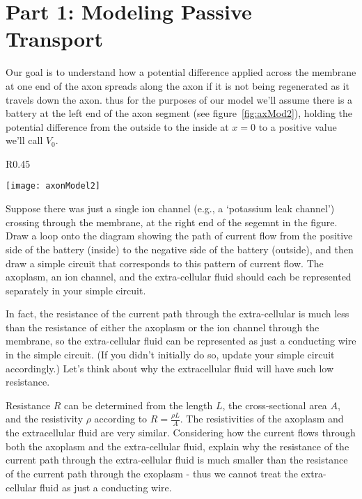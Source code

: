 \section*{Part 1: Modeling Passive Transport}
Our goal is to understand how a potential difference applied across the membrane at one end of the axon spreads along the axon if it is not being regenerated as it travels down the axon.
thus for the purposes of our model we'll assume there is a battery at the left end of the axon segment (see figure~\ref{fig:axMod2}), holding the potential difference from the outside to the inside at $x=0$ to a positive value we'll call $V_{0}$.
\begin{wrapfigure}{R}{0.45\textwidth}
  \vspace{-25pt}  
  \begin{center}
    \texttt{[image: axonModel2]}
  \end{center}
  \caption{Model of potential difference across axon membrane.}
  \label{fig:axMod2}
  \vspace{-5pt}
\end{wrapfigure}
\par 
Suppose there was just a single ion channel (e.g., a `potassium leak channel') crossing through the membrane, at the right end of the segemnt in the figure. 
Draw a loop onto the diagram showing the path of current flow from the positive side of the battery (inside) to the negative side of the battery (outside), and then draw a simple circuit that corresponds to this pattern of current flow.
The axoplasm, an ion channel, and the extra-cellular fluid should each be represented separately in your simple circuit.
\par 
In fact, the resistance of the current path through the extra-cellular is much less than the resistance of either the axoplasm or the ion channel through the membrane, so the extra-cellular fluid can be represented as just a conducting wire in the simple circuit.
(If you didn't initially do so, update your simple circuit accordingly.) 
Let's think about why the extracellular fluid will have such low resistance.
\par 
Resistance $R$ can be determined from the length $L$, the cross-sectional area $A$, and the resistivity $\rho$ according to $R = \frac{\rho L}{A}$.
The resistivities of the axoplasm and the extracellular fluid are very similar.
Considering how the current flows through both the axoplasm and the extra-cellular fluid, explain why the resistance of the current path through the extra-cellular fluid is much smaller than the resistance of the current path through the exoplasm - thus we cannot treat the extra-cellular fluid as just a conducting wire.
